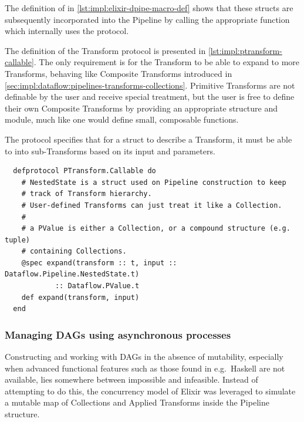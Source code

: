 The definition of \exs{~>} in \cref{lst:impl:elixir-dpipe-macro-def} shows that these structs are subsequently incorporated into the Pipeline by calling the appropriate function which internally uses the protocol.

The definition of the Transform protocol is presented in \cref{lst:impl:ptransform-callable}.
The only requirement is for the Transform to be able to expand to more Transforms, behaving like Composite Transforms introduced in \cref{sec:impl:dataflow:pipelines-transforms-collections}.
Primitive Transforms are not definable by the user and receive special treatment, but the user is free to define their own Composite Transforms by providing an appropriate structure and module, much like one would define small, composable functions.

\begin{codelisting}
	\caption[The definition of the  protocol.]{The  protocol specifies that for a struct to describe a Transform, it must be able to  into sub-Transforms based on its input and parameters.}
	\label{lst:impl:ptransform-callable}
	\begin{verbatim}
  defprotocol PTransform.Callable do
    # NestedState is a struct used on Pipeline construction to keep
    # track of Transform hierarchy.
    # User-defined Transforms can just treat it like a Collection.
    # 
    # a PValue is either a Collection, or a compound structure (e.g. tuple)
    # containing Collections.
    @spec expand(transform :: t, input :: Dataflow.Pipeline.NestedState.t)
            :: Dataflow.PValue.t
    def expand(transform, input)
  end
	\end{verbatim}
	
\end{codelisting}


\subsubsection{Managing DAGs using asynchronous processes}


Constructing and working with DAGs in the absence of mutability, especially when advanced functional features such as those found in e.g.\ Haskell are not available, lies somewhere between impossible and infeasible.
Instead of attempting to do this, the concurrency model of Elixir was leveraged to simulate a mutable map of Collections and Applied Transforms inside the Pipeline structure.

